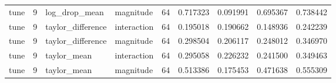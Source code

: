 \begin{tabular}{lrllrrrrr}
tune & 9 & log_drop_mean & magnitude & 64 & 0.717323 & 0.091991 & 0.695367 & 0.738442 \\
tune & 9 & taylor_difference & interaction & 64 & 0.195018 & 0.190662 & 0.148936 & 0.242239 \\
tune & 9 & taylor_difference & magnitude & 64 & 0.298504 & 0.206117 & 0.248012 & 0.346970 \\
tune & 9 & taylor_mean & interaction & 64 & 0.295058 & 0.226232 & 0.241500 & 0.349463 \\
tune & 9 & taylor_mean & magnitude & 64 & 0.513386 & 0.175453 & 0.471638 & 0.555309 \\
\bottomrule
\end{tabular}
